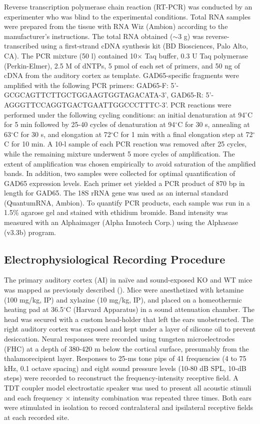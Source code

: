 Reverse transcription polymerase chain reaction (RT-PCR) was conducted by an experimenter who was blind to the experimental conditions. Total RNA samples were prepared from the tissue with RNA Wiz (Ambion) according to the manufacturer's instructions. The total RNA obtained ($\sim$3 \textmu g) was reverse-transcribed using a first-strand cDNA synthesis kit (BD Biosciences, Palo Alto, CA). The PCR mixture (50 \textmu l) contained 10$\times$ Taq buffer, 0.3 U Taq polymerase (Perkin-Elmer), 2.5 \textmu M of dNTPs, 5 pmol of each set of primers, and 50 ng of cDNA from the auditory cortex as template. GAD65-specific fragments were amplified with the following PCR primers: GAD65-F: 5'-GCGCAGTTCTTGCTGGAAGTGGTAGACATA-3', GAD65-R: 5'-AGGGTTCCAGGTGACTGAATTGGCCCTTTC-3'. PCR reactions were performed under the following cycling conditions: an initial denaturation at 94$^\circ$C for 5 min followed by 25-40 cycles of denaturation at 94$^\circ$C for 30 s, annealing at 63$^\circ$C for 30 s, and elongation at 72$^\circ$C for 1 min with a final elongation step at 72$^\circ$C for 10 min. A 10-\textmu l sample of each PCR reaction was removed after 25 cycles, while the remaining mixture underwent 5 more cycles of amplification. The extent of amplification was chosen empirically to avoid saturation of the amplified bands. In addition, two samples were collected for optimal quantification of GAD65 expression levels. Each primer set yielded a PCR product of 870 bp in length for GAD65. The 18S rRNA gene was used as an internal standard (QuantumRNA, Ambion). To quantify PCR products, each sample was run in a 1.5\% agarose gel and stained with ethidium bromide. Band intensity was measured with an Alphaimager (Alpha Innotech Corp.) using the Alphaease (v3.3b) program.

\subsection{Electrophysiological Recording Procedure}
The primary auditory cortex (AI) in na\"ive and sound-exposed KO and WT mice was mapped as previously described (\cite{Kim2009, Yang2013}). Mice were anesthetized with ketamine (100 mg/kg, IP) and xylazine (10 mg/kg, IP), and placed on a homeothermic heating pad at 36.5$^\circ$C (Harvard Apparatus) in a sound attenuation chamber. The head was secured with a custom head-holder that left the ears unobstructed. The right auditory cortex was exposed and kept under a layer of silicone oil to prevent desiccation. Neural responses were recorded using tungsten microelectrodes (FHC) at a depth of 380-420 \textmu m below the cortical surface, presumably from the thalamorecipient layer. Responses to 25-ms tone pips of 41 frequencies (4 to 75 kHz, 0.1 octave spacing) and eight sound pressure levels (10-80 dB SPL, 10-dB steps) were recorded to reconstruct the frequency-intensity receptive field. A TDT coupler model electrostatic speaker was used to present all acoustic stimuli and each frequency $\times$ intensity combination was repeated three times. Both ears were stimulated in isolation to record contralateral and ipsilateral receptive fields at each recorded site.


